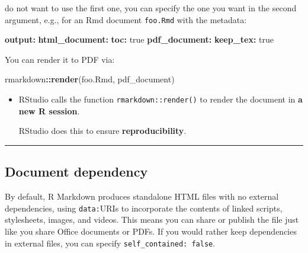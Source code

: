 \documentclass[
  a4paper,
  twoside,
  openright]{book}
\newenvironment{Shaded}{\begin{snugshade}}{\end{snugshade}}
\newcommand{\AttributeTok}[1]{\textcolor[rgb]{0.13,0.29,0.53}{#1}}
\newcommand{\CharTok}[1]{\textcolor[rgb]{0.31,0.60,0.02}{#1}}
\newcommand{\FunctionTok}[1]{\textcolor[rgb]{0.13,0.29,0.53}{\textbf{#1}}}
\newcommand{\KeywordTok}[1]{\textcolor[rgb]{0.13,0.29,0.53}{\textbf{#1}}}
\newcommand{\NormalTok}[1]{#1}
\newcommand{\SpecialCharTok}[1]{\textcolor[rgb]{0.81,0.36,0.00}{\textbf{#1}}}
\newcommand{\StringTok}[1]{\textcolor[rgb]{0.31,0.60,0.02}{#1}}
\theoremstyle{definition}
\theoremstyle{definition}
\theoremstyle{definition}
\theoremstyle{definition}
\theoremstyle{remark}
\begin{document}
do not want to use the first one, you can specify the one you want in the second argument, e.g., for an Rmd document \texttt{foo.Rmd} with the metadata:

\begin{Shaded}
\begin{Highlighting}[]
\FunctionTok{output}\KeywordTok{:}
\AttributeTok{  }\FunctionTok{html\_document}\KeywordTok{:}
\AttributeTok{    }\FunctionTok{toc}\KeywordTok{:}\AttributeTok{ }\CharTok{true}
\AttributeTok{  }\FunctionTok{pdf\_document}\KeywordTok{:}
\AttributeTok{    }\FunctionTok{keep\_tex}\KeywordTok{:}\AttributeTok{ }\CharTok{true}
\end{Highlighting}
\end{Shaded}

You can render it to PDF via:

\begin{Shaded}
\begin{Highlighting}[]
\NormalTok{rmarkdown}\SpecialCharTok{::}\FunctionTok{render}\NormalTok{(}\StringTok{\textquotesingle{}foo.Rmd\textquotesingle{}}\NormalTok{, }\StringTok{\textquotesingle{}pdf\_document\textquotesingle{}}\NormalTok{)}
\end{Highlighting}
\end{Shaded}

\begin{itemize}
\item
  RStudio calls the function \texttt{rmarkdown::render()} to render the document in \textbf{a new R session}.

  RStudio does this to ensure \textbf{reproducibility}.
\end{itemize}

\begin{center}\rule{0.5\linewidth}{0.5pt}\end{center}

\subsection*{Document dependency}\label{document-dependency}

By default, R Markdown produces standalone HTML files with no external dependencies, using \texttt{data:}URIs to incorporate the contents of linked scripts, stylesheets, images, and videos. This means you can share or publish the file just like you share Office documents or PDFs. If you would rather keep dependencies in external files, you can specify \texttt{self\_contained:\ false}.
\end{document}
